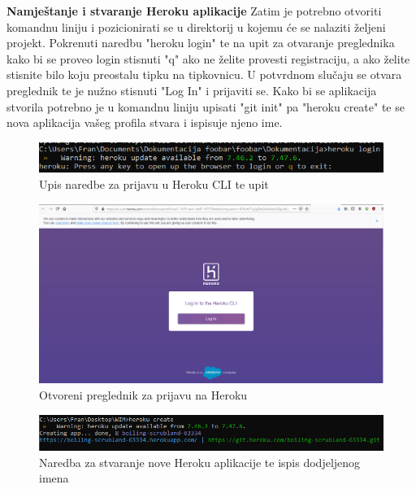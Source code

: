 			\vspace{5mm}
			\noindent \textbf{Namještanje i stvaranje Heroku aplikacije}\newline
			Zatim je potrebno otvoriti komandnu liniju i pozicionirati se u direktorij u kojemu će se nalaziti željeni projekt. Pokrenuti naredbu "heroku login" te na upit za otvaranje preglednika kako bi se proveo login stisnuti "q" ako ne 
			želite provesti registraciju, a ako želite stisnite bilo koju preostalu tipku na tipkovnicu. U potvrdnom slučaju se otvara preglednik te je nužno stisnuti "Log In" i prijaviti se. Kako bi se aplikacija stvorila potrebno je u komandnu liniju upisati "git init" pa "heroku create" te se nova aplikacija vašeg profila stvara i ispisuje njeno ime.
			\begin{figure}[H]
				\includegraphics[scale=0.8]{slike/heroku_login.PNG} 
				\centering
				\caption{Upis naredbe za prijavu u Heroku CLI te upit}
				\label{fig:heroku_login}%
			\end{figure}
		
			\begin{figure}[H]
				\includegraphics[scale=0.4]{slike/heroku_login_browser.PNG} 
				\centering
				\caption{Otvoreni preglednik za prijavu na Heroku}
				\label{fig:heroku_login_browser}%
			\end{figure}
		
			\begin{figure}[H]
				\includegraphics[scale=0.8]{slike/heroku_stvorena_aplikacija.PNG} 
				\centering
				\caption{Naredba za stvaranje nove Heroku aplikacije te ispis dodjeljenog imena}
				\label{fig:heroku_stvorena_aplikacija}%
			\end{figure}
			
